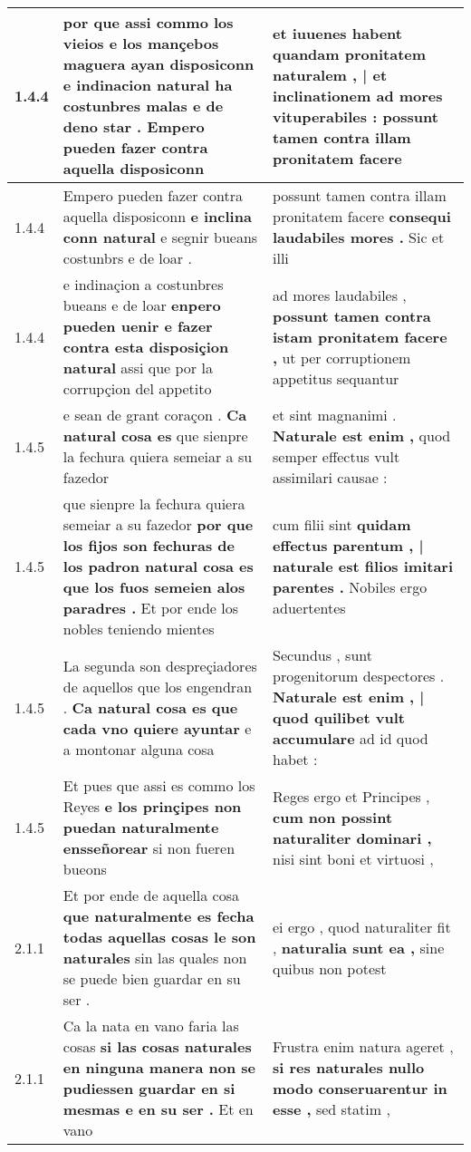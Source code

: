 \begin{tabular}{|p{1cm}|p{6.5cm}|p{6.5cm}|}
1.4.4 & por que assi commo los vieios e los mançebos maguera ayan disposiconn \textbf{ e indinacion natural ha costunbres malas e de deno star . } Empero pueden fazer contra aquella disposiconn & et iuuenes habent \textbf{ quandam pronitatem naturalem , | et inclinationem ad mores vituperabiles : } possunt tamen contra illam pronitatem facere \\\hline
1.4.4 & Empero pueden fazer contra aquella disposiconn \textbf{ e inclina conn natural } e segnir bueans costunbrs e de loar . & possunt tamen contra illam pronitatem facere \textbf{ consequi laudabiles mores . } Sic et illi \\\hline
1.4.4 & e indinaçion a costunbres bueans e de loar \textbf{ enpero pueden uenir e fazer contra esta disposiçion natural } assi que por la corrupçion del appetito & ad mores laudabiles , \textbf{ possunt tamen contra istam pronitatem facere , } ut per corruptionem appetitus sequantur \\\hline
1.4.5 & e sean de grant coraçon . \textbf{ Ca natural cosa es } que sienpre la fechura quiera semeiar a su fazedor & et sint magnanimi . \textbf{ Naturale est enim , } quod semper effectus vult assimilari causae : \\\hline
1.4.5 & que sienpre la fechura quiera semeiar a su fazedor \textbf{ por que los fijos son fechuras de los padron natural cosa es que los fuos semeien alos paradres . } Et por ende los nobles teniendo mientes & cum filii sint \textbf{ quidam effectus parentum , | naturale est filios imitari parentes . } Nobiles ergo aduertentes \\\hline
1.4.5 & La segunda son despreçiadores de aquellos que los engendran . \textbf{ Ca natural cosa es que cada vno quiere ayuntar } e a montonar alguna cosa & Secundus , sunt progenitorum despectores . \textbf{ Naturale est enim , | quod quilibet vult accumulare } ad id quod habet : \\\hline
1.4.5 & Et pues que assi es commo los Reyes \textbf{ e los prinçipes non puedan naturalmente ensseñorear } si non fueren bueons & Reges ergo et Principes , \textbf{ cum non possint naturaliter dominari , } nisi sint boni et virtuosi , \\\hline
2.1.1 & Et por ende de aquella cosa \textbf{ que naturalmente es fecha todas aquellas cosas le son naturales } sin las quales non se puede bien guardar en su ser . & ei ergo , quod naturaliter fit , \textbf{ naturalia sunt ea , } sine quibus non potest \\\hline
2.1.1 & Ca la nata en vano faria las cosas \textbf{ si las cosas naturales en ninguna manera non se pudiessen guardar en si mesmas e en su ser . } Et en vano & Frustra enim natura ageret , \textbf{ si res naturales nullo modo conseruarentur in esse , } sed statim , \\\hline

\end{tabular}
